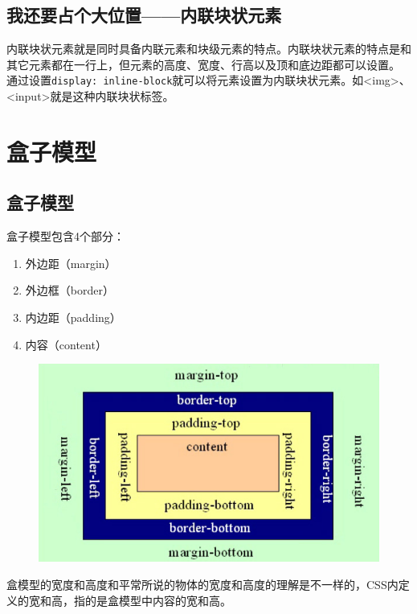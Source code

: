 \subsection{我还要占个大位置——内联块状元素}

内联块状元素就是同时具备内联元素和块级元素的特点。内联块状元素的特点是和其它元素都在一行上，但元素的高度、宽度、行高以及顶和底边距都可以设置。\\

通过设置\lstinline|display: inline-block|就可以将元素设置为内联块状元素。如<img>、<input>就是这种内联块状标签。

\newpage

\section{盒子模型}

\subsection{盒子模型}

盒子模型包含4个部分：

\begin{enumerate}
	\item 外边距（margin）
	\item 外边框（border）
	\item 内边距（padding）
	\item 内容（content）
\end{enumerate}

\begin{figure}[H]
	\centering
	\includegraphics[scale=0.7]{img/C8/8-2/1.png}
\end{figure}

盒模型的宽度和高度和平常所说的物体的宽度和高度的理解是不一样的，CSS内定义的宽和高，指的是盒模型中内容的宽和高。\\

